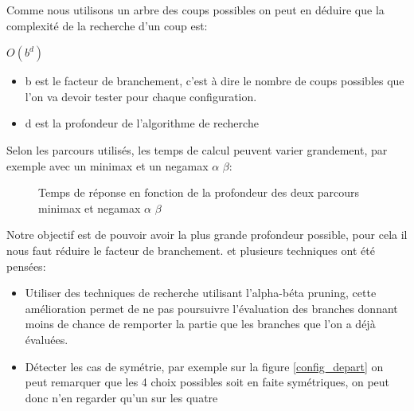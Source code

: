 \documentclass[12pt]{article}
\begin{document}
Comme nous utilisons un arbre des coups possibles on peut en déduire que la complexité de  la recherche d'un coup est:
\begin{LARGE}
\begin{math}
O(b^{d})
\end{math}
\end{LARGE}
\begin{itemize}
\item b est le facteur de branchement, c'est à dire le nombre de coups possibles que l'on va devoir tester pour chaque configuration.
\item d est la profondeur de l'algorithme de recherche
\end{itemize}
Selon les parcours utilisés, les temps de calcul peuvent varier grandement, par exemple avec un  minimax et un negamax $\alpha$ $\beta$:\\
\begin{figure}[H]
\centering
\caption{Temps de réponse en fonction de la profondeur des deux parcours minimax et negamax $\alpha$ $\beta$}
\label{temps_de_reponse}
\end{figure}

Notre objectif est de pouvoir avoir la plus grande profondeur possible, pour cela il nous faut réduire le facteur de branchement. et plusieurs techniques ont été pensées:
\begin{itemize}
\item Utiliser des techniques de recherche utilisant l'alpha-béta pruning, cette amélioration permet de ne pas poursuivre l'évaluation des branches donnant moins de chance de remporter la partie que les branches que l'on a déjà évaluées.
\item Détecter les cas de symétrie, par exemple sur la figure \ref{config_depart} on peut remarquer que les 4 choix possibles soit en faite symétriques, on peut donc n'en regarder qu'un sur les quatre
\end{itemize}
\medbreak
\end{document}
